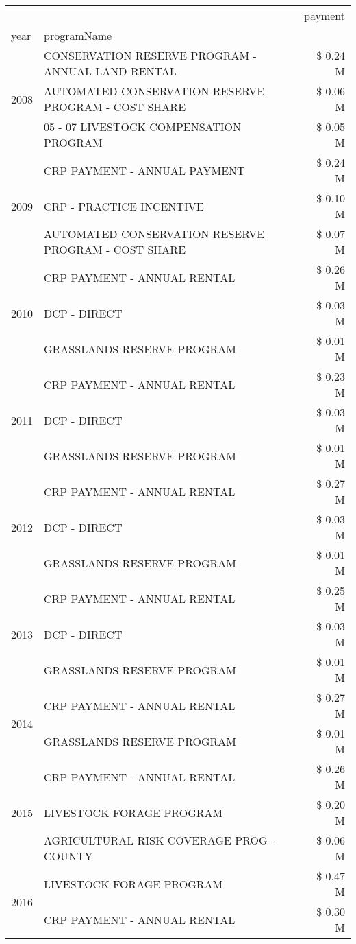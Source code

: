\begin{tabular}{llr}
\toprule
 &  & payment \\
year & programName &  \\
\midrule
\multirow[t]{3}{*}{2008} & CONSERVATION RESERVE PROGRAM - ANNUAL LAND RENTAL & \$ 0.24 M \\
 & AUTOMATED CONSERVATION RESERVE PROGRAM - COST SHARE & \$ 0.06 M \\
 & 05 - 07 LIVESTOCK COMPENSATION PROGRAM & \$ 0.05 M \\
\cline{1-3}
\multirow[t]{3}{*}{2009} & CRP PAYMENT - ANNUAL PAYMENT & \$ 0.24 M \\
 & CRP - PRACTICE INCENTIVE & \$ 0.10 M \\
 & AUTOMATED CONSERVATION RESERVE PROGRAM - COST SHARE & \$ 0.07 M \\
\cline{1-3}
\multirow[t]{3}{*}{2010} & CRP PAYMENT - ANNUAL RENTAL & \$ 0.26 M \\
 & DCP - DIRECT & \$ 0.03 M \\
 & GRASSLANDS RESERVE PROGRAM & \$ 0.01 M \\
\cline{1-3}
\multirow[t]{3}{*}{2011} & CRP PAYMENT - ANNUAL RENTAL & \$ 0.23 M \\
 & DCP - DIRECT & \$ 0.03 M \\
 & GRASSLANDS RESERVE PROGRAM & \$ 0.01 M \\
\cline{1-3}
\multirow[t]{3}{*}{2012} & CRP PAYMENT - ANNUAL RENTAL & \$ 0.27 M \\
 & DCP - DIRECT & \$ 0.03 M \\
 & GRASSLANDS RESERVE PROGRAM & \$ 0.01 M \\
\cline{1-3}
\multirow[t]{3}{*}{2013} & CRP PAYMENT - ANNUAL RENTAL & \$ 0.25 M \\
 & DCP - DIRECT & \$ 0.03 M \\
 & GRASSLANDS RESERVE PROGRAM & \$ 0.01 M \\
\cline{1-3}
\multirow[t]{2}{*}{2014} & CRP PAYMENT - ANNUAL RENTAL & \$ 0.27 M \\
 & GRASSLANDS RESERVE PROGRAM & \$ 0.01 M \\
\cline{1-3}
\multirow[t]{3}{*}{2015} & CRP PAYMENT - ANNUAL RENTAL & \$ 0.26 M \\
 & LIVESTOCK FORAGE PROGRAM & \$ 0.20 M \\
 & AGRICULTURAL RISK COVERAGE PROG - COUNTY & \$ 0.06 M \\
\cline{1-3}
\multirow[t]{3}{*}{2016} & LIVESTOCK FORAGE PROGRAM & \$ 0.47 M \\
 & CRP PAYMENT - ANNUAL RENTAL & \$ 0.30 M \\

\end{tabular}
